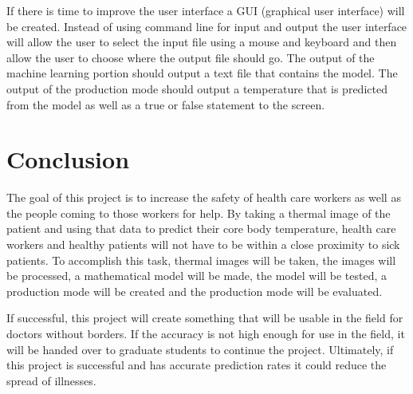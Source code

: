 ﻿\documentclass[onecolumn, draftclsnofoot,10pt, compsoc]{IEEEtran}
\begin{document}
If there is time to improve the user interface a GUI (graphical user interface) will be created. Instead of using command line for input and output the user interface will allow the user to select the input file using a mouse and keyboard and then allow the user to choose where the output file should go. The output of the machine learning portion should output a text file that contains the model. The output of the production mode should output a temperature that is predicted from the model as well as a true or false statement to the screen. \cite{BrianTech}

\section{Conclusion}

The goal of this project is to increase the safety of health care workers as well as the people coming to those workers for help. By taking a thermal image of the patient and using that data to predict their core body temperature, health care workers and healthy patients will not have to be within a close proximity to sick patients. To accomplish this task, thermal images will be taken, the images will be processed, a mathematical model will be made, the model will be tested, a production mode will be created and the production mode will be evaluated. 

If successful, this project will create something that will be usable in the field for doctors without borders. If the accuracy is not high enough for use in the field, it will be handed over to graduate students to continue the project. Ultimately, if this project is successful and has accurate prediction rates it could reduce the spread of illnesses.




\end{document}
